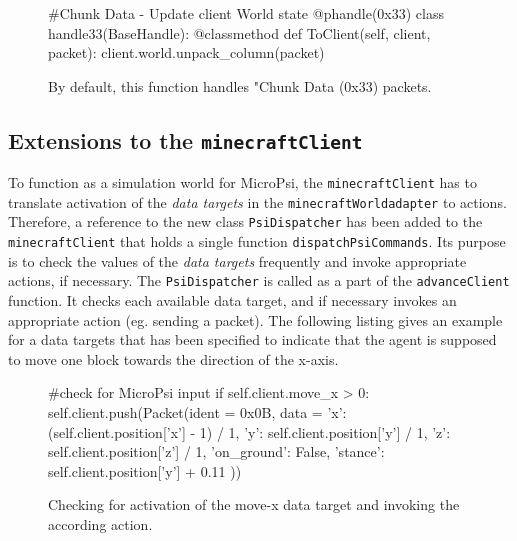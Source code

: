 		\begin{figure}[ht]
			\centering
			\begin{minipage}{11cm}
				\begin{pseudocode}
#Chunk Data - Update client World state
@phandle(0x33)
class handle33(BaseHandle):
	@classmethod
	def ToClient(self, client, packet):
		client.world.unpack_column(packet)
					\end{pseudocode}
				\caption{By default, this function handles "Chunk Data (0x33) packets.}
				\label{packet_handling}
			\end{minipage}
		\end{figure}

        \subsection{Extensions to the \texttt{minecraftClient}}
        \label{extensions_client}
To function as a simulation world for MicroPsi, the \texttt{minecraftClient} has to translate activation of the \emph{data targets} in the \texttt{minecraftWorldadapter} to actions. Therefore, a reference to the new class \texttt{PsiDispatcher} has been added to the \texttt{minecraftClient} that holds a single function \texttt{dispatchPsiCommands}. Its purpose is to check the values of the \emph{data targets} frequently and invoke appropriate actions, if necessary. The \texttt{PsiDispatcher} is called as a part of the \texttt{advanceClient} function. It checks each available data target, and if necessary invokes an appropriate action (eg. sending a packet). The following listing gives an example for a data targets that has been specified to indicate that the agent is supposed to move one block towards the direction of the x-axis.

		\begin{figure}[ht]
			\centering
			\begin{minipage}{11cm}
				\begin{pseudocode}
#check for MicroPsi input
if self.client.move_x > 0:
    self.client.push(Packet(ident = 0x0B, data = {
        'x': (self.client.position['x'] - 1) / 1,
        'y': self.client.position['y'] / 1,
        'z': self.client.position['z'] / 1,
        'on_ground': False,
        'stance': self.client.position['y'] + 0.11
        }))
					\end{pseudocode}
				\caption{Checking for activation of the move-x data target and invoking the according action.}
				\label{listing_dispatch}
			\end{minipage}
		\end{figure}

